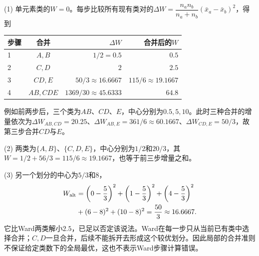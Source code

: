 (1) 单元素类的$W=0$。每步比较所有现有类对的$\Delta W=\dfrac{n_an_b}{n_a+n_b}(\bar x_a-\bar x_b)^2$，得到\begin{center}\small\setlength{\tabcolsep}{5pt}
\begin{tabular}{@{}lcrr@{}}
\toprule
步骤 & 合并 & $\Delta W$ & 合并后的$W$ \\
\midrule
1 & $A,B$ & $1/2=0.5$ & $0.5$ \\
2 & $C,D$ & $2$ & $2.5$ \\
3 & $CD,E$ & $50/3\approx16.6667$ & $115/6\approx19.1667$ \\
4 & $AB,CDE$ & $1369/30\approx45.6333$ & $64.8$ \\
\bottomrule
\end{tabular}
\end{center}例如前两步后，三个类为$AB$、$CD$、$E$，中心分别为$0.5,5,10$。此时三种合并的增量依次为$\Delta W_{AB,CD}=20.25$、$\Delta W_{AB,E}=361/6\approx60.1667$、$\Delta W_{CD,E}=50/3$，故第三步合并$CD$与$E$。\par (2) 两类为$\{A,B\}$、$\{C,D,E\}$，中心分别为$1/2$和$20/3$，其$W=1/2+56/3=115/6\approx19.1667$，也等于前三步增量之和。\par (3) 另一个划分的中心为$5/3$和$8$，\[\begin{aligned}W_{\rm alt}&=\left(0-\frac53\right)^2+\left(1-\frac53\right)^2+\left(4-\frac53\right)^2\\&\quad +(6-8)^2+(10-8)^2=\frac{50}{3}\approx16.6667.\end{aligned}\]它比Ward两类解小$2.5$，已足以否定该说法。Ward在每一步只从当前已有类中选择合并；$C,D$一旦合并，后续不能拆开去形成这个较优划分。因此局部的合并准则不保证给定类数下的全局最优，这也不表示Ward步骤计算错误。
\par\nobreak\smallskip{}

